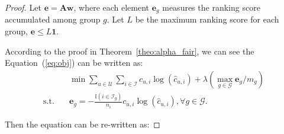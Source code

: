 \begin{proof}
    Let $\bm{e} = \bm{A}\bm{w}$, where each element $\bm{e}_g$ measures the ranking score accumulated among group $g$. Let $L$ be the maximum ranking score for each group, \ie $\bm{e}\leq L\bm{1}$.
    
    According to the proof in Theorem~\ref{theo:alpha_fair}, we can see the Equation~(\ref{eq:obj}) can be written as:
     \begin{align*}
            \quad& \min \sum_{u\in\mathcal{U}}\sum_{i\in \mathcal{I}}c_{u,i}\log(\hat{c}_{u,i}) + \lambda (\max_{g\in\mathcal{G}} \bm{e}_g/m_g) \\
            \textrm{s.t.}\quad & \bm{e}_g = -\frac{\mathbb{I}(i\in \mathcal{I}_g)}{n_i}c_{u,i}\log(\hat{c}_{u,i}), \forall g\in\mathcal{G}.
    \end{align*}

    Then the equation can be re-written as:


\end{proof}
